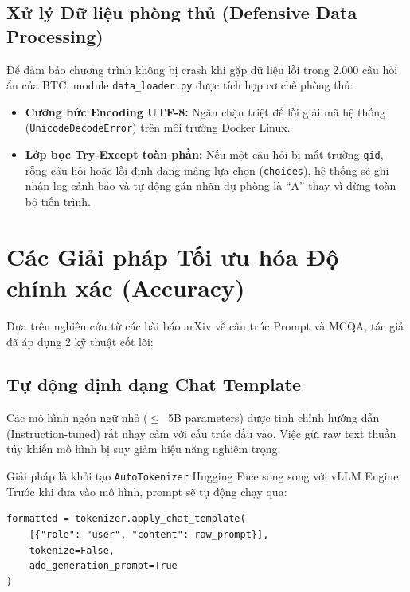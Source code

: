 \documentclass[12pt,a4paper]{article}
\begin{document}
\subsection{Xử lý Dữ liệu phòng thủ (Defensive Data Processing)}

Để đảm bảo chương trình không bị crash khi gặp dữ liệu lỗi trong
2.000 câu hỏi ẩn của BTC, module \texttt{data\_loader.py} được tích hợp
cơ chế phòng thủ:
\begin{itemize}
    \item \textbf{Cưỡng bức Encoding UTF-8:} Ngăn chặn triệt để lỗi giải mã
          hệ thống (\texttt{UnicodeDecodeError}) trên môi trường Docker Linux.
    \item \textbf{Lớp bọc Try-Except toàn phần:} Nếu một câu hỏi bị mất
          trường \texttt{qid}, rỗng câu hỏi hoặc lỗi định dạng mảng
          lựa chọn (\texttt{choices}), hệ thống sẽ ghi nhận log cảnh báo
          và tự động gán nhãn dự phòng là ``A'' thay vì dừng toàn bộ tiến trình.
\end{itemize}

\section{Các Giải pháp Tối ưu hóa Độ chính xác (Accuracy)}

Dựa trên nghiên cứu từ các bài báo arXiv về cấu trúc Prompt và MCQA,
tác giả đã áp dụng 2 kỹ thuật cốt lõi:

\subsection{Tự động định dạng Chat Template}

Các mô hình ngôn ngữ nhỏ ($\leq$~5B parameters) được tinh chỉnh hướng dẫn
(Instruction-tuned) rất nhạy cảm với cấu trúc đầu vào.
Việc gửi raw text thuần túy khiến mô hình bị suy giảm hiệu năng nghiêm trọng.

Giải pháp là khởi tạo \texttt{AutoTokenizer} Hugging Face song song với vLLM Engine.
Trước khi đưa vào mô hình, prompt sẽ tự động chạy qua:

\begin{lstlisting}
formatted = tokenizer.apply_chat_template(
    [{"role": "user", "content": raw_prompt}],
    tokenize=False,
    add_generation_prompt=True
)
\end{lstlisting}
\end{document}
